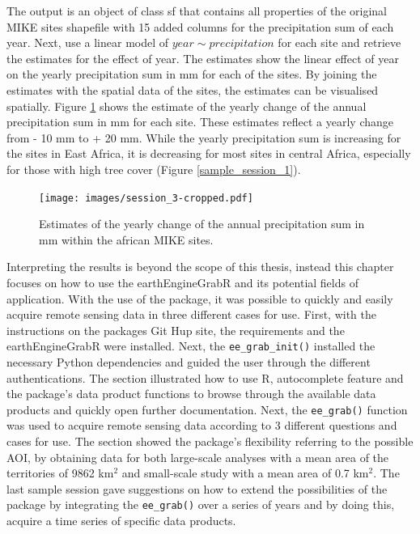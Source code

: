 The output is an object of class sf that contains all properties of the original MIKE sites shapefile with 15 added columns for the precipitation sum of each year.
Next, use a linear model of $year  \sim precipitation$ for each site and retrieve the estimates for the effect of year. 
The estimates show the linear effect of year on the yearly precipitation sum in mm for each of the sites. 
By joining the estimates with the spatial data of the sites, the estimates can be visualised spatially. 
Figure \ref{change} shows the estimate of the yearly change of the annual precipitation sum in mm for each site. These estimates reflect a yearly change from - 10 mm to + 20 mm. While the yearly precipitation sum is increasing for the sites in East Africa, it is decreasing for most sites in central Africa, especially for those with high tree cover (Figure \ref*{sample_session_1}).

\begin{center}
	\begin{figure}[h]
		\begin{center}
			\texttt{[image: images/session\_3-cropped.pdf]}
			\caption{Estimates of the yearly change of the annual precipitation sum in mm within the african MIKE sites.}
			\label{change}
		\end{center}
	\end{figure}
\end{center}



Interpreting the results is beyond the scope of this thesis, instead this chapter focuses on how to use the earthEngineGrabR and its potential fields of application.
With the use of the package, it was possible to quickly and easily acquire remote sensing data in three different cases for use. First, with the instructions on the packages Git Hup site, the requirements and the earthEngineGrabR were installed. Next, the \texttt{ee\_grab\_init()} installed the necessary Python dependencies and guided the user through the different authentications. The section illustrated how to use R, autocomplete feature and the package's data product functions to browse through the available data products and quickly open further documentation. Next, the \texttt{ee\_grab()} function was used to acquire remote sensing data according to 3 different questions and cases for use. The section showed the package's flexibility referring to the possible AOI, by obtaining data for both large-scale analyses with a mean area of the territories of 9862 km$^2$ and small-scale study with a mean area of 0.7 km$^2$.
The last sample session gave suggestions on how to extend the possibilities of the package by integrating the \texttt{ee\_grab()} over a series of years and by doing this, acquire a time series of specific data products.




